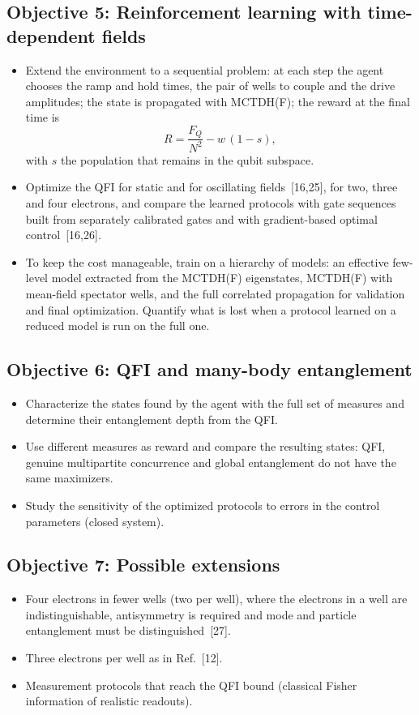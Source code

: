 \documentclass[12pt,a4paper]{article}
\begin{document}
\subsection*{Objective 5: Reinforcement learning with time-dependent fields}
\begin{itemize}
  \item Extend the environment to a sequential problem: at each step
  the agent chooses the ramp and hold times, the pair of wells to
  couple and the drive amplitudes; the state is propagated with
  MCTDH(F); the reward at the final time is
  \[
     R=\frac{F_Q}{N^2}-w\,(1-s),
  \]
  with $s$ the population that remains in the qubit subspace.
  \item Optimize the QFI for static and for oscillating
  fields~[16,25], for
  two, three and four electrons, and compare the learned protocols
  with gate sequences built from separately calibrated gates and with
  gradient-based optimal control~[16,26].
  \item To keep the cost manageable, train on a hierarchy of models:
  an effective few-level model extracted from the MCTDH(F)
  eigenstates, MCTDH(F) with mean-field spectator wells, and the full
  correlated propagation for validation and final optimization.
  Quantify what is lost when a protocol learned on a reduced model is
  run on the full one.
\end{itemize}

\subsection*{Objective 6: QFI and many-body entanglement}
\begin{itemize}
  \item Characterize the states found by the agent with the full set
  of measures and determine their entanglement depth from the QFI.
  \item Use different measures as reward and compare the resulting
  states: QFI, genuine multipartite concurrence and global
  entanglement do not have the same maximizers.
  \item Study the sensitivity of the optimized protocols to errors
  in the control parameters (closed system).
\end{itemize}

\subsection*{Objective 7: Possible extensions}
\begin{itemize}
  \item Four electrons in fewer wells (two per well), where the
  electrons in a well are indistinguishable, antisymmetry is required
  and mode and particle entanglement must be distinguished~[27].
  \item Three electrons per well as in Ref.~[12].
  \item Measurement protocols that reach the QFI bound (classical
  Fisher information of realistic readouts).
\end{itemize}
\end{document}
